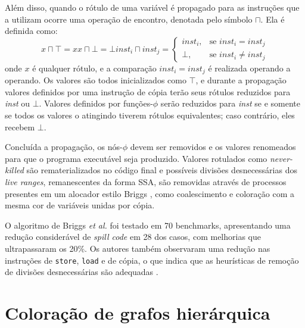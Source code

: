 \documentclass[
	12pt,				%
	openright,			%
	oneside,			%
	a4paper,			%
	tccpreliminar,			%
	]{ABNT-DC-UEL}
\begin{document}
Além disso, quando o rótulo de uma variável é propagado para as instruções que a utilizam ocorre uma operação de encontro, denotada pelo símbolo $\sqcap$. Ela é definida como:
\begin{subequations}
    \begin{equation}
        x \sqcap \top = x
    \end{equation}
    \begin{equation}
        x \sqcap \bot = \bot
    \end{equation}
    \begin{equation}
        \textit{inst}_i \sqcap \textit{inst}_j = 
        \begin{cases}
            \textit{inst}_i, & \text{se } \textit{inst}_i = \textit{inst}_j \\
            \bot, & \text{se } \textit{inst}_i \ne \textit{inst}_j
        \end{cases}
    \end{equation}
\end{subequations}
onde $x$ é qualquer rótulo, e a comparação $\textit{inst}_i = \textit{inst}_j$ é realizada operando a operando. Os valores são todos inicializados como $\top$, e durante a propagação valores definidos por uma instrução de cópia terão seus rótulos reduzidos para \textit{inst} ou $\bot$. Valores definidos por funções-$\phi$ serão reduzidos para \textit{inst} se e somente se todos os valores o atingindo tiverem rótulos equivalentes; caso contrário, eles recebem $\bot$.

Concluída a propagação, os nós-$\phi$ devem ser removidos e os valores renomeados para que o programa executável seja produzido. Valores rotulados como \textit{never-killed} são rematerializados no código final e possíveis divisões desnecessárias dos \textit{live ranges}, remanescentes da forma SSA, são removidas através de processos presentes em um alocador estilo Briggs \cite{briggs:92}, como coalescimento e coloração com a mesma cor de variáveis unidas por cópia.

O algoritmo de Briggs \textit{et al.} foi testado em 70 benchmarks, apresentando uma redução considerável de \textit{spill code} em 28 dos casos, com melhorias que ultrapassaram os 20\%. Os autores também observaram uma redução nas instruções de \texttt{store}, \texttt{load} e de cópia, o que indica que as heurísticas de remoção de divisões desnecessárias são adequadas \cite{briggs2:92}.

\section{Coloração de grafos hierárquica}
\end{document}

